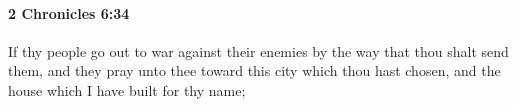 
		\paragraph{2 Chronicles 6:34} %
			\label{2CHRONICLES-6-34}

			If thy people go out to war against their enemies by the way that thou shalt send them, and they pray unto thee toward this city which thou hast chosen, and the house which I have built for thy name;


